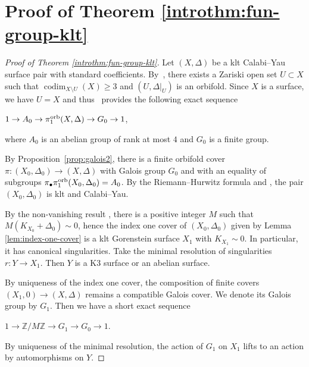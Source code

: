 \documentclass{amsart}
\newcommand{\codim}{\operatorname{codim}}
\theoremstyle{definition}
\theoremstyle{remark}
\numberwithin{equation}{section}
\begin{document}
\section{Proof of Theorem \ref{introthm:fun-group-klt}}\label{sec:klt-cy-stand}


\begin{proof}[Proof of Theorem \ref{introthm:fun-group-klt}]
Let $(X,\Delta)$ be a klt Calabi--Yau surface pair with standard coefficients. By~\cite[Lemma~2.7]{CGG23}, there exists a Zariski open set $U\subset X$ such that $\codim_{X\setminus U}(X)\geq 3$ and $(U,\Delta|_{U})$ is an orbifold. Since $X$ is a surface, we have $U=X$ and thus~\cite[Theorem~4.2]{CC14} provides the following exact sequence
 \begin{center}
     $1\rightarrow A_0\rightarrow \pi_1^{\rm orb}(X,\Delta)\rightarrow G_0\rightarrow 1$,
 \end{center}
 where $A_0$ is an abelian group of rank at most $4$ and $G_0$ is a finite group.

By Proposition~\ref{prop:galois2}, there is a finite orbifold cover $\pi:(X_0,\Delta_0)\rightarrow (X, \Delta)$ with Galois group $G_0$ and with an equality of subgroups $\pi_{\bullet}\pi_1^{\rm orb}(X_0,\Delta_0)=A_0$. %
By the Riemann--Hurwitz formula and \cite[Proposition 5.20]{KM98}, the pair $(X_0,\Delta_0)$ is klt and Calabi--Yau.

By the non-vanishing result \cite[V.4.9 Corollary]{Nak04}, there is a positive integer $M$ such that $M(K_{X_0}+\Delta_0)\sim 0$, hence the index one cover of $(X_0,\Delta_0)$ given by Lemma \ref{lem:index-one-cover} is a klt Gorenstein surface $X_1$ with $K_{X_1}\sim 0$. In particular, it has canonical singularities. Take the minimal resolution of singularities $r:Y\rightarrow X_1$. Then $Y$ is a K3 surface or an abelian surface.

By uniqueness of the index one cover, the composition of finite covers $(X_1,0)\rightarrow (X,\Delta)$ remains a compatible Galois cover. We denote its Galois group by $G_1$. Then we have a short exact sequence
\begin{center}
    $1\rightarrow \mathbb{Z}/M\mathbb{Z}\rightarrow G_1\rightarrow G_0\rightarrow 1$.
\end{center}
By uniqueness of the minimal resolution, the action of $G_1$ on $X_1$ lifts to an action by automorphisms on $Y$.


\end{proof}
\end{document}
